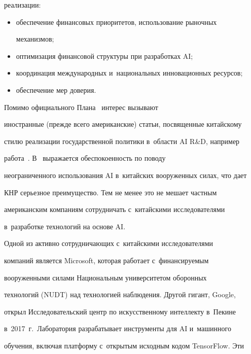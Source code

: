 реализации:


     \begin{itemize}


\item обеспечение финансовых приоритетов, использование рыночных 


механизмов;


\item оптимизация финансовой структуры при разработках AI;


\item координация международных и~национальных инновационных ресурсов;


\item обеспечение мер доверия.


\end{itemize}


     


     Помимо официального Плана~\cite{6-b} интерес вызывают 


иностранные (прежде всего американские) статьи, посвященные китайскому 


стилю реализации государственной политики в~области AI R\&D, например 


работа~\cite{8-b}. В~\cite{8-b} выражается обеспокоенность по поводу 


неограниченного использования AI в~китайских вооруженных силах, что дает 


КНР серьезное преимущество. Тем не менее это не мешает частным 


американским компаниям сотрудничать с~китайскими исследователями 


в~разработке технологий на основе AI.


     


     Одной из активно сотрудничающих с~китайскими исследователями 


компаний является Microsoft, которая работает с~фи\-нан\-си\-ру\-емым 


вооруженными силами Национальным университетом оборонных 


технологий (NUDT) над технологией наблюдения. Другой гигант, Google, 


открыл Исследовательский центр по искусственному интеллекту в~Пекине 


в~2017~г.\ Лаборатория разрабатывает инструменты для AI и~машинного 


обучения, вклю\-чая платформу с~открытым исходным кодом TensorFlow. Эти 



